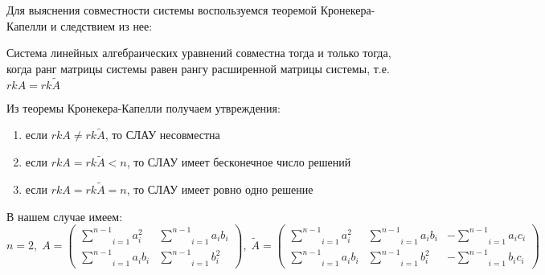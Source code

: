 Для выяснения совместности системы воспользуемся теоремой Кронекера-Капелли и следствием из нее:
\begin{theorem}\label{plane/the:1}
	Система линейных алгебраических уравнений совместна тогда и только тогда, когда ранг матрицы системы равен рангу расширенной матрицы системы, т.е. $rk A = rk \tilde{A}$
\end{theorem}

\begin{conseq}\label{plane/conseq:1}
	Из теоремы Кронекера-Капелли получаем утвреждения:
	\begin{enumerate}
		\item если $rk A \not = rk \tilde{A}$, то СЛАУ несовместна
		\item если $rk A = rk \tilde{A} < n$, то СЛАУ имеет бесконечное число решений
		\item если $rk A = rk \tilde{A} = n$, то СЛАУ имеет ровно одно решение
	\end{enumerate}
\end{conseq}

В нашем случае имеем:
$$n=2, \; A = \begin{pmatrix}
	\underset{i=1}{\overset{n-1}{\sum}} a_i^2 & \underset{i=1}{\overset{n-1}{\sum}} a_i b_i\\
	\underset{i=1}{\overset{n-1}{\sum}} a_i b_i & \underset{i=1}{\overset{n-1}{\sum}} b_i^2
\end{pmatrix}, \; \tilde{A} = \begin{pmatrix}
	\underset{i=1}{\overset{n-1}{\sum}} a_i^2 & \underset{i=1}{\overset{n-1}{\sum}} a_i b_i & -\underset{i=1}{\overset{n-1}{\sum}} a_i c_i\\
	\underset{i=1}{\overset{n-1}{\sum}} a_i b_i & \underset{i=1}{\overset{n-1}{\sum}} b_i^2 & -\underset{i=1}{\overset{n-1}{\sum}} b_i c_i
\end{pmatrix}$$

